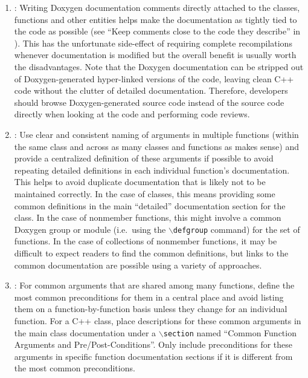 \begin{enumerate}

{}\item\DOXWriteInHeaders: Writing Doxygen documentation comments directly
attached to the classes, functions and other entities helps make the
documentation as tightly tied to the code as possible (see ``Keep comments
close to the code they describe'' in {}\cite[Section
32.5]{CodeComplete2nd04}).  This has the unfortunate side-effect of requiring
complete recompilations whenever documentation is modified but the overall
benefit is usually worth the disadvantages.  Note that the Doxygen
documentation can be stripped out of Doxygen-generated hyper-linked versions
of the code, leaving clean C++ code without the clutter of detailed
documentation.  Therefore, developers should browse Doxygen-generated source
code instead of the source code directly when looking at the code and
performing code reviews.

{}\item\DOXUseCentralizedDefintions: Use clear and consistent naming of
arguments in multiple functions (within the same class and across as many
classes and functions as makes sense) and provide a centralized definition of
these arguments if possible to avoid repeating detailed definitions in each
individual function's documentation.  This helps to avoid duplicate
documentation that is likely not to be maintained correctly.  In the case of
classes, this means providing some common definitions in the main ``detailed''
documentation section for the class.  In the case of nonmember functions, this
might involve a common Doxygen group or module (i.e.\ using the
{}\texttt{$\backslash$defgroup} command) for the set of functions.  In the
case of collections of nonmember functions, it may be difficult to expect
readers to find the common definitions, but links to the common documentation
are possible using a variety of approaches.

{}\item\DOXUseCentralizedPrePostConditions: For common arguments that are
shared among many functions, define the most common preconditions for them in
a central place and avoid listing them on a function-by-function basis unless
they change for an individual function.  For a C++ class, place descriptions
for these common arguments in the main class documentation under a
{}\texttt{$\backslash$section} named ``Common Function Arguments and
Pre/Post-Conditions''.  Only include preconditions for these arguments in
specific function documentation sections if it is different from the most
common preconditions.


\end{enumerate}
